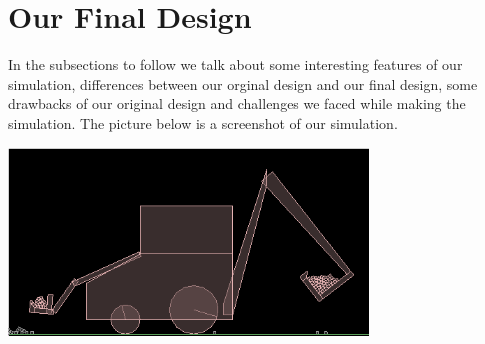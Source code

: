 \documentclass[11pt]{article}
\begin{document}
\section{Our Final Design}
	In the subsections to follow we talk about some interesting features of our simulation, differences between our orginal design and our final design, some drawbacks of our original design and challenges we faced while making the simulation. The picture below is a screenshot of our simulation.
	\begin{center}\includegraphics[height=5cm]{FinalDesign2.png}\end{center}
\end{document}
